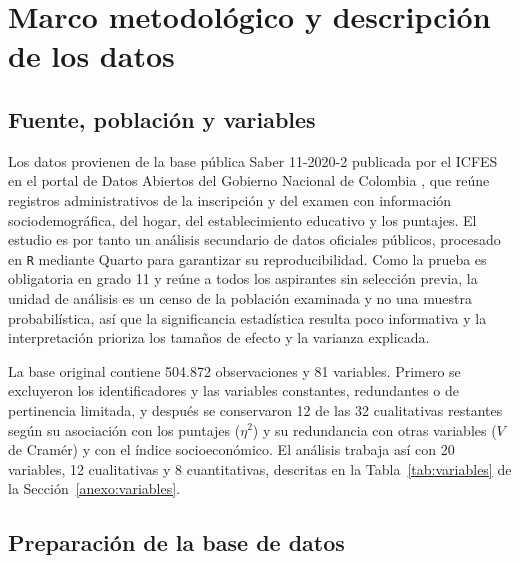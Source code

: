 \documentclass[12pt]{article}
\begin{document}
\vspace{0.1cm}

\section{Marco metodológico y descripción de los datos}
\label{sec:metodologia}

\subsection{Fuente, población y variables}

Los datos provienen de la base pública Saber 11-2020-2 publicada por el ICFES en el portal de
Datos Abiertos del Gobierno Nacional de Colombia \parencite{icfes2026}, que reúne registros
administrativos de la inscripción y del examen con información sociodemográfica, del hogar, del
establecimiento educativo y los puntajes. El estudio es por tanto un análisis secundario de datos
oficiales públicos, procesado en \texttt{R} mediante Quarto para garantizar su reproducibilidad.
Como la prueba es obligatoria en grado 11 y reúne a todos los aspirantes sin selección previa, la
unidad de análisis es un censo de la población examinada y no una muestra probabilística, así que
la significancia estadística resulta poco informativa y la interpretación prioriza los tamaños de
efecto y la varianza explicada.

La base original contiene 504.872 observaciones y 81 variables. Primero se excluyeron los
identificadores y las variables constantes, redundantes o de pertinencia limitada, y después se
conservaron 12 de las 32 cualitativas restantes según su asociación con los puntajes ($\eta^2$) y
su redundancia con otras variables ($V$ de Cramér) y con el índice socioeconómico. El análisis trabaja así con 20 variables, 12 cualitativas y 8 cuantitativas,
descritas en la Tabla~\ref{tab:variables} de la Sección~\ref{anexo:variables}.

\subsection{Preparación de la base de datos}
\label{sec:preparacion}
\end{document}

